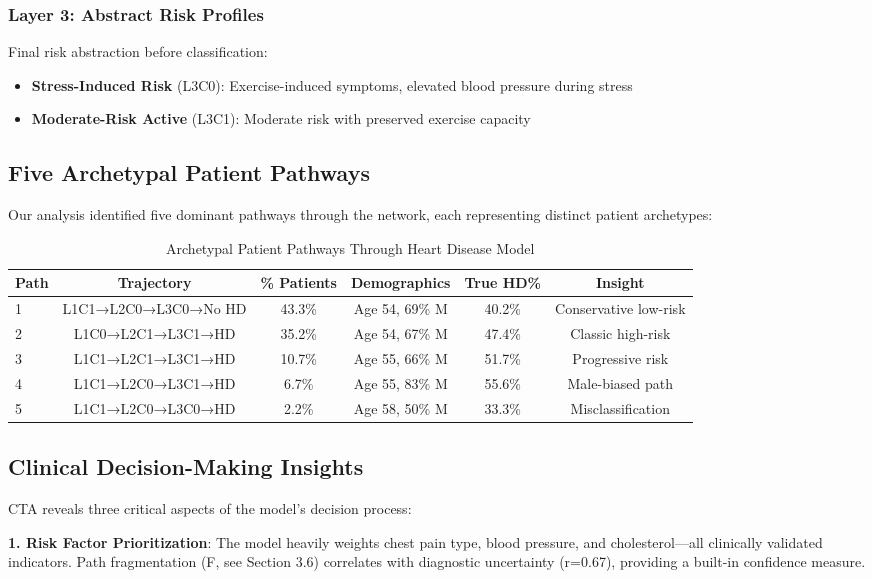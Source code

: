 \subsubsection{Layer 3: Abstract Risk Profiles}
Final risk abstraction before classification:
\begin{itemize}
    \item \textbf{Stress-Induced Risk} (L3C0): Exercise-induced symptoms, elevated blood pressure during stress
    \item \textbf{Moderate-Risk Active} (L3C1): Moderate risk with preserved exercise capacity
\end{itemize}

\subsection{Five Archetypal Patient Pathways}

Our analysis identified five dominant pathways through the network, each representing distinct patient archetypes:

\begin{table}[h!]
\centering
\caption{Archetypal Patient Pathways Through Heart Disease Model}
\label{tab:heart_pathways}
\begin{tabular}{lccccc}
\toprule
Path & Trajectory & \% Patients & Demographics & True HD\% & Insight \\
\midrule
1 & L1C1→L2C0→L3C0→No HD & 43.3\% & Age 54, 69\% M & 40.2\% & Conservative low-risk \\
2 & L1C0→L2C1→L3C1→HD & 35.2\% & Age 54, 67\% M & 47.4\% & Classic high-risk \\
3 & L1C1→L2C1→L3C1→HD & 10.7\% & Age 55, 66\% M & 51.7\% & Progressive risk \\
4 & L1C1→L2C0→L3C1→HD & 6.7\% & Age 55, 83\% M & 55.6\% & Male-biased path \\
5 & L1C1→L2C0→L3C0→HD & 2.2\% & Age 58, 50\% M & 33.3\% & Misclassification \\
\bottomrule
\end{tabular}
\end{table}

\subsection{Clinical Decision-Making Insights}

CTA reveals three critical aspects of the model's decision process:

\textbf{1. Risk Factor Prioritization}: The model heavily weights chest pain type, blood pressure, and cholesterol—all clinically validated indicators. Path fragmentation (F, see Section 3.6) correlates with diagnostic uncertainty (r=0.67), providing a built-in confidence measure.

